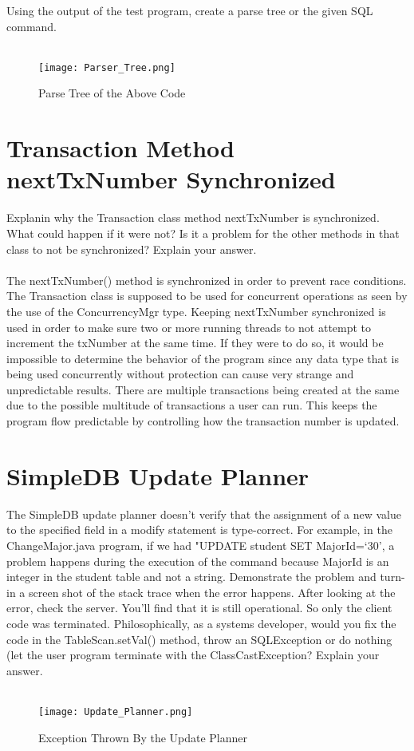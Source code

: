 \documentclass [letter,12pt] {article}
\begin{document}
    Using the output of the test program, create a parse tree or the given SQL command.
    \\
    \\
    \begin{figure}[htp]
        \centering
        \texttt{[image: Parser\_Tree.png]}
        \caption{Parse Tree of the Above Code}
        \label{fig:updateplanner}
    \end{figure}
    
    
\section{Transaction Method nextTxNumber Synchronized}
    Explanin why the Transaction class method nextTxNumber is synchronized. What 
    could happen if it were not? Is it a problem for the other methods in that class
    to not be synchronized? Explain your answer.
    \\
    \\
    The nextTxNumber() method is synchronized in order to prevent race
    conditions. The Transaction class is supposed to be used for concurrent
    operations as seen by the use of the ConcurrencyMgr type. Keeping
    nextTxNumber synchronized is used in order to make sure two or more 
    running threads to not attempt to increment the txNumber at the same
    time. If they were to do so, it would be impossible to determine the 
    behavior of the program since any data type that is being used 
    concurrently without protection can cause very strange and unpredictable
    results. There are multiple transactions being created at the same due
    to the possible multitude of transactions a user can run. This keeps 
    the program flow predictable by controlling how the transaction number 
    is updated.
    
    
\section{SimpleDB Update Planner}
    The SimpleDB update planner doesn't verify that the assignment of a new value to
    the specified field in a modify statement is type-correct. For example, in the 
    ChangeMajor.java program, if we had "UPDATE student SET MajorId=`30', a problem 
    happens during the execution of the command because MajorId is an integer in the
    student table and not a string. Demonstrate the problem and turn-in a screen 
    shot of the stack trace when the error happens. After looking at the error,
    check the server. You’ll find that it is still operational. So only the client 
    code was terminated. Philosophically, as a systems developer, would you fix the
    code in the TableScan.setVal() method, throw an SQLException or do nothing (let 
    the user program terminate with the ClassCastException? Explain your answer.
    \\
    \\
    \begin{figure}[htp]
        \centering
        \texttt{[image: Update\_Planner.png]}
        \caption{Exception Thrown By the Update Planner}
        \label{fig:updateplanner}
    \end{figure}
    
\end{document}
